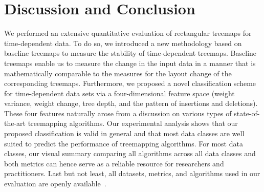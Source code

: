 




\section{Discussion and Conclusion}
\label{sec:discussion-2}

We performed an extensive quantitative evaluation of rectangular treemaps for time-dependent data. To do so, we introduced a new methodology based on baseline treemaps to measure the stability of time-dependent treemaps. Baseline treemaps enable us to measure the change in the input data in a manner that is mathematically comparable to the measures for the layout change of the corresponding treemaps. Furthermore, we proposed a novel classification scheme for time-dependent data sets via a four-dimensional feature space (weight variance, weight change, tree depth, and the pattern of insertions and deletions). These four features naturally arose from a discussion on various types of state-of-the-art treemapping algorithms. Our experimental analysis shows that our proposed classification is valid in general and that most data classes are well suited to predict the performance of treemapping algorithms. For most data classes, our visual summary comparing all algorithms across all data classes and both metrics can hence serve as a reliable resource for researchers and practitioners. Last but not least, all datasets, metrics, and algorithms used in our evaluation are openly available~\citep{URLTreemaps}.

